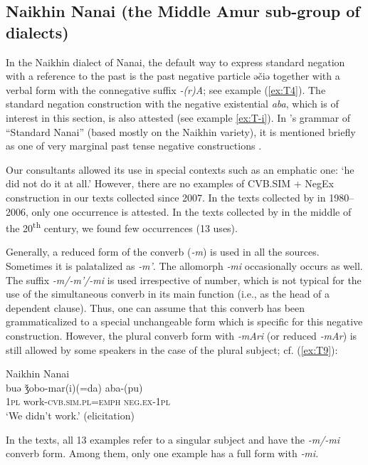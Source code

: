 \documentclass[output=paper]{langscibook}
\begin{document}
\subsection{Naikhin Nanai (the Middle Amur sub-group of dialects)}\label{sec:T5.1}

In the Naikhin dialect of Nanai, the default way to express standard negation with a reference to the past is the past negative particle əčiə together with a verbal form with the connegative suffix \textit{-(r)A}; see example (\ref{ex:T4}). The standard negation construction with the negative existential \textit{aba}, which is of interest in this section, is also attested (see example \ref{ex:T-i}). In \citeauthor{avrorin1961a}’s grammar of “Standard Nanai” (based mostly on the Naikhin variety), it is mentioned briefly as one of very marginal past tense negative constructions \citeyearpar[108]{avrorin1961a}.

Our consultants allowed its use in special contexts such as an emphatic one: ‘he did not do it at all.’ However, there are no examples of CVB.SIM + NegEx construction in our texts collected since 2007. In the texts collected by \citet{beljdy2012a} in 1980–2006, only one occurrence is attested. In the texts collected by \citet{avrorin1986a} in the middle of the 20\textsuperscript{th} century, we found few occurrences (13 uses).

Generally, a reduced form of the converb (\textit{-m}) is used in all the sources. Sometimes it is palatalized as \textit{‑m'}. The allomorph \textit{‑mi} occasionally occurs as well. The suffix \textit{-m/-m'/-mi} is used irrespective of number, which is not typical for the use of the simultaneous converb in its main function (i.e., as the head of a dependent clause). Thus, one can assume that this converb has been grammaticalized to a special unchangeable form which is specific for this negative construction. However, the plural converb form with \textit{‑mAri} (or reduced \textit{‑mAr}) is still allowed by some speakers in the case of the plural subject; cf. (\ref{ex:T9}):

\ea Naikhin Nanai \label{ex:T9}\\
	\gll buə	ǯobo-mar(i)(=da)	aba-(pu)\\
	\textsc{1pl}	work-\textsc{cvb.sim.pl=emph}	\textsc{neg.ex-1pl}\\
	\glt `We didn’t work.' (elicitation)
\z

In the texts, all 13 examples refer to a singular subject and have the \textit{-m/-mi} converb form. Among them, only one example has a full form with \textit{‑mi}.
\end{document}
